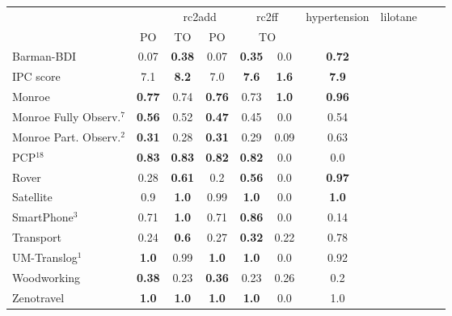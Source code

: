 \begin{tabular}{lccccccccccl} 
\toprule 
  && \multicolumn{2}{c}{rc2add} & \multicolumn{2}{c}{rc2ff} & \multicolumn{2}{c}{hypertension} & \multicolumn{2}{c}{lilotane} \\ 
\cmidrule(lr){3-4} \cmidrule(lr){5-6} \cmidrule(lr){7-8} \cmidrule(lr){9-10}  
 &PO & TO & PO &\multicolumn{2}{c}{ TO  } \\ 
\midrule 
Barman-BDI & 0.07 & \textbf{0.38} & 0.07 & \textbf{0.35} & 0.0 &\multicolumn{2}{c}{ \textbf{0.72}  } \\ 
\midrule 
 IPC score & 7.1 & \textbf{8.2} & 7.0 & \textbf{7.6} & \textbf{1.6} &\multicolumn{2}{c}{ \textbf{7.9}  } \\ 
\midrule 
 Monroe & \textbf{0.77} & 0.74 & \textbf{0.76} & 0.73 & \textbf{1.0} &\multicolumn{2}{c}{ \textbf{0.96}  } \\ 
Monroe Fully Observ.$^{7}$ & \textbf{0.56} & 0.52 & \textbf{0.47} & 0.45 & 0.0 &\multicolumn{2}{c}{ 0.54  } \\ 
Monroe Part. Observ.$^{2}$ & \textbf{0.31} & 0.28 & \textbf{0.31} & 0.29 & 0.09 &\multicolumn{2}{c}{ 0.63  } \\ 
PCP$^{18}$ & \textbf{0.83} & \textbf{0.83} & \textbf{0.82} & \textbf{0.82} & 0.0 &\multicolumn{2}{c}{ 0.0  } \\ 
Rover & 0.28 & \textbf{0.61} & 0.2 & \textbf{0.56} & 0.0 &\multicolumn{2}{c}{ \textbf{0.97}  } \\ 
Satellite & 0.9 & \textbf{1.0} & 0.99 & \textbf{1.0} & 0.0 &\multicolumn{2}{c}{ \textbf{1.0}  } \\ 
SmartPhone$^{3}$ & 0.71 & \textbf{1.0} & 0.71 & \textbf{0.86} & 0.0 &\multicolumn{2}{c}{ 0.14  } \\ 
Transport & 0.24 & \textbf{0.6} & 0.27 & \textbf{0.32} & 0.22 &\multicolumn{2}{c}{ 0.78  } \\ 
UM-Translog$^{1}$ & \textbf{1.0} & 0.99 & \textbf{1.0} & \textbf{1.0} & 0.0 &\multicolumn{2}{c}{ 0.92  } \\ 
Woodworking & \textbf{0.38} & 0.23 & \textbf{0.36} & 0.23 & 0.26 &\multicolumn{2}{c}{ 0.2  } \\ 
Zenotravel & \textbf{1.0} & \textbf{1.0} & \textbf{1.0} & \textbf{1.0} & 0.0 &\multicolumn{2}{c}{ 1.0  } \\ 
\bottomrule 
 \end{tabular} 

